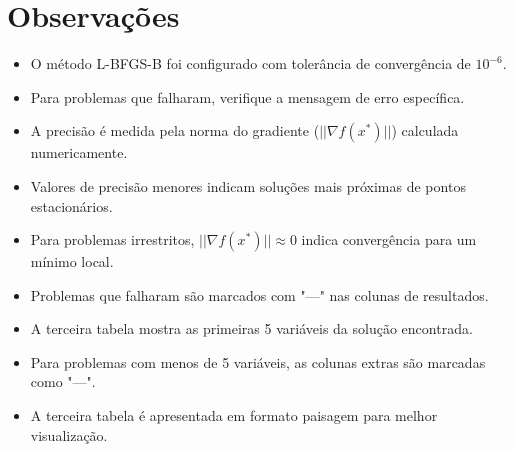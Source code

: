 \documentclass[12pt]{article}
\begin{document}
\section{Observações}

\begin{itemize}
\item O método L-BFGS-B foi configurado com tolerância de convergência de $10^{-6}$.
\item Para problemas que falharam, verifique a mensagem de erro específica.
\item A precisão é medida pela norma do gradiente ($||\nabla f(x^*)||$) calculada numericamente.
\item Valores de precisão menores indicam soluções mais próximas de pontos estacionários.
\item Para problemas irrestritos, $||\nabla f(x^*)|| \approx 0$ indica convergência para um mínimo local.
\item Problemas que falharam são marcados com "---" nas colunas de resultados.
\item A terceira tabela mostra as primeiras 5 variáveis da solução encontrada.
\item Para problemas com menos de 5 variáveis, as colunas extras são marcadas como "---".
\item A terceira tabela é apresentada em formato paisagem para melhor visualização.
\end{itemize}
\end{document}
